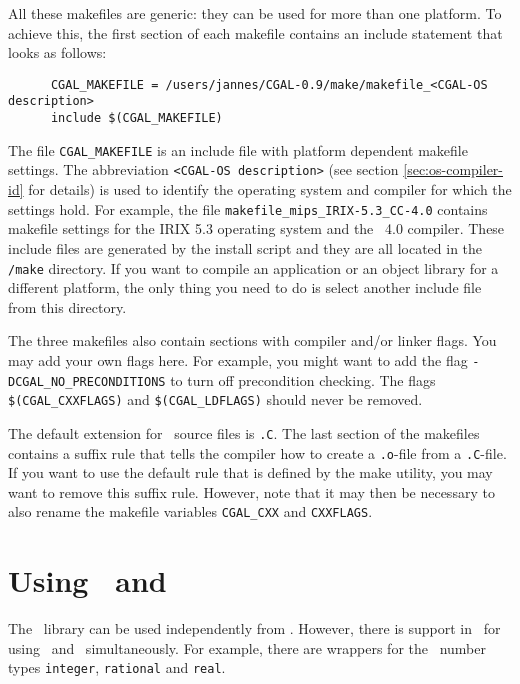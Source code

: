 All these makefiles are generic: they can be used for more than one platform.
To achieve this, the first section of each makefile contains an include
statement that looks as follows:

\begin{verbatim}
      CGAL_MAKEFILE = /users/jannes/CGAL-0.9/make/makefile_<CGAL-OS description>
      include $(CGAL_MAKEFILE)
\end{verbatim}

The file \texttt{CGAL\_MAKEFILE} is an include file with platform
dependent makefile settings. The abbreviation {\tt <CGAL-OS
  description>} (see section \ref{sec:os-compiler-id} for details) is
used to identify the operating system and compiler for which the
settings hold. For example, the file
\texttt{makefile\_mips\_IRIX-5.3\_CC-4.0} contains makefile settings
for the IRIX 5.3 operating system and the \mipsprocc\ 4.0
compiler. These include files are generated by the install script and
they are all located in the \texttt{\cgaldir/make} directory. If you
want to compile an application or an object library for a different
platform, the only thing you need to do is select another include file
from this directory.

The three makefiles also contain sections with compiler and/or linker
flags.  You may add your own flags here. For example, you might want
to add the flag \texttt{-DCGAL\_NO\_PRECONDITIONS} to turn off
precondition checking. The flags \texttt{\$(CGAL\_CXXFLAGS)} and
\texttt{\$(CGAL\_LDFLAGS)} should never be removed.

The default extension for \cgal\ source files is \texttt{.C}.  The
last section of the makefiles contains a suffix rule that tells the
compiler how to create a \texttt{.o}-file from a \texttt{.C}-file.  If
you want to use the default rule that is defined by the make utility,
you may want to remove this suffix rule.  However, note that it may
then be necessary to also rename the makefile variables
\texttt{CGAL\_CXX} and \texttt{CXXFLAGS}.

\section{Using \cgal\ and \leda \label{sec:leda}}

The \cgal\ library can be used independently from \leda.  However,
there is support in \cgal\ for using \cgal\ and \leda\ simultaneously.
For example, there are wrappers for the \leda\ number types
\texttt{integer}, \texttt{rational} and \texttt{real}.

